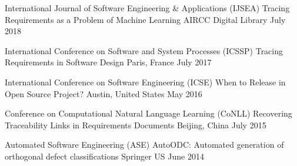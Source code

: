 

\begin{cventries}

  \cventry
  {International Journal of Software Engineering \& Applications (IJSEA)} %
  {Tracing Requirements as a Problem of Machine Learning} %
  {AIRCC Digital Library} %
  {July 2018} %
  {}

  \cventry
  {International Conference on Software and System Processes (ICSSP)} %
  {Tracing Requirements in Software Design} %
  {Paris, France} %
  {July 2017} %
  {}

  \cventry
  {International Conference on Software Engineering (ICSE)} %
  {When to Release in Open Source Project?} %
  {Austin, United States} %
  {May 2016} %
  {}

  \cventry
  {Conference on Computational Natural Language Learning (CoNLL)} %
  {Recovering Traceability Links in Requirements Documents} %
  {Beijing, China} %
  {July 2015} %
  {}

  \cventry
  {Automated Software Engineering (ASE)} %
  {AutoODC: Automated generation of orthogonal defect classifications} %
  {Springer US}
  {June 2014} %
  {}

\end{cventries}
